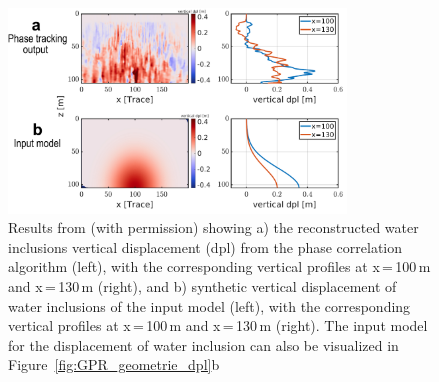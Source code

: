 \begin{figure}[h]
    \centering
    \includegraphics[width=0.8\textwidth]{chapters/Discussion/GPR_dpl_phase.pdf}
    \caption{Results from \cite{Aichele&al2024} (with permission) showing a) the reconstructed water inclusions vertical displacement (dpl) from the phase correlation algorithm (left), with the corresponding vertical profiles at x\,=\,100\,m and x\,=\,130\,m (right), and b) synthetic vertical displacement of water inclusions of the input model (left), with the corresponding vertical profiles at x\,=\,100\,m and x\,=\,130\,m (right). The input model for the displacement of water inclusion can also be visualized in Figure~\ref{fig:GPR_geometrie_dpl}b}
    \label{fig:GPR_phase}
\end{figure}

